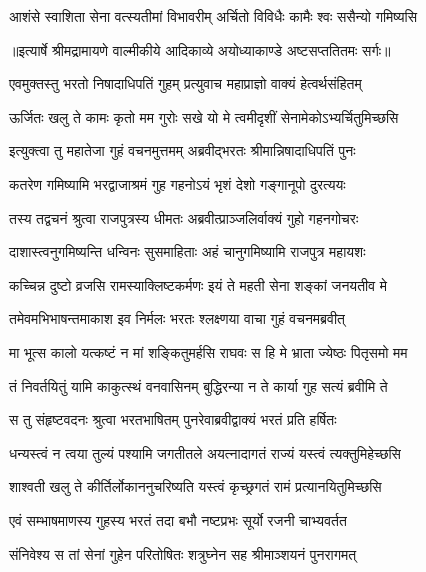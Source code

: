 \twolineshloka
{आशंसे स्वाशिता सेना वत्स्यतीमां विभावरीम्}
{अर्चितो विविधैः कामैः श्वः ससैन्यो गमिष्यसि} %


{॥इत्यार्षे श्रीमद्रामायणे वाल्मीकीये आदिकाव्ये अयोध्याकाण्डे अष्टसप्ततितमः सर्गः॥}


\twolineshloka
{एवमुक्तस्तु भरतो निषादाधिपतिं गुहम्}
{प्रत्युवाच महाप्राज्ञो वाक्यं हेत्वर्थसंहितम्} %

\twolineshloka
{ऊर्जितः खलु ते कामः कृतो मम गुरोः सखे}
{यो मे त्वमीदृशीं सेनामेकोऽभ्यर्चितुमिच्छसि} %

\twolineshloka
{इत्युक्त्वा तु महातेजा गुहं वचनमुत्तमम्}
{अब्रवीद्भरतः श्रीमान्निषादाधिपतिं पुनः} %

\twolineshloka
{कतरेण गमिष्यामि भरद्वाजाश्रमं गुह}
{गहनोऽयं भृशं देशो गङ्गानूपो दुरत्ययः} %

\twolineshloka
{तस्य तद्वचनं श्रुत्वा राजपुत्रस्य धीमतः}
{अब्रवीत्प्राञ्जलिर्वाक्यं गुहो गहनगोचरः} %

\twolineshloka
{दाशास्त्वनुगमिष्यन्ति धन्विनः सुसमाहिताः}
{अहं चानुगमिष्यामि राजपुत्र महायशः} %

\twolineshloka
{कच्चिन्न दुष्टो व्रजसि रामस्याक्लिष्टकर्मणः}
{इयं ते महती सेना शङ्कां जनयतीव मे} %

\twolineshloka
{तमेवमभिभाषन्तमाकाश इव निर्मलः}
{भरतः श्लक्ष्णया वाचा गुहं वचनमब्रवीत्} %

\twolineshloka
{मा भूत्स कालो यत्कष्टं न मां शङ्कितुमर्हसि}
{राघवः स हि मे भ्राता ज्येष्ठः पितृसमो मम} %

\twolineshloka
{तं निवर्तयितुं यामि काकुत्स्थं वनवासिनम्}
{बुद्धिरन्या न ते कार्या गुह सत्यं ब्रवीमि ते} %

\twolineshloka
{स तु संहृष्टवदनः श्रुत्वा भरतभाषितम्}
{पुनरेवाब्रवीद्वाक्यं भरतं प्रति हर्षितः} %

\twolineshloka
{धन्यस्त्वं न त्वया तुल्यं पश्यामि जगतीतले}
{अयत्नादागतं राज्यं यस्त्वं त्यक्तुमिहेच्छसि} %

\twolineshloka
{शाश्वती खलु ते कीर्तिर्लोकाननुचरिष्यति}
{यस्त्वं कृच्छ्रगतं रामं प्रत्यानयितुमिच्छसि} %

\twolineshloka
{एवं सम्भाषमाणस्य गुहस्य भरतं तदा}
{बभौ नष्टप्रभः सूर्यो रजनी चाभ्यवर्तत} %

\twolineshloka
{संनिवेश्य स तां सेनां गुहेन परितोषितः}
{शत्रुघ्नेन सह श्रीमाञ्शयनं पुनरागमत्} %

